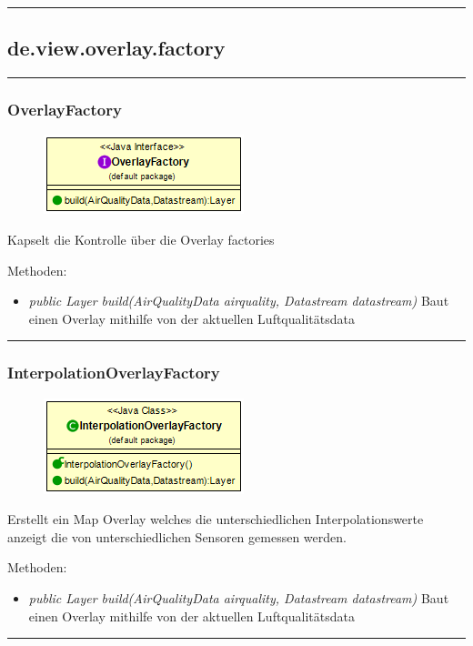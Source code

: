 \rule{\textwidth}{0.4pt}
\subsection{de.view.overlay.factory}

\rule{\textwidth}{0.4pt}
\subsubsection{OverlayFactory}
\begin{minipage}{0.3\textwidth}
    \begin{figure}[H]
        {\centering\includegraphics[scale = 0.6
        ]{media/view/factory/OverlayFactory_Class.png}}
    \end{figure}
    \end{minipage} \hfill
    \begin{minipage}{0.6\textwidth}
Kapselt die Kontrolle über die Overlay factories
\end{minipage}
\vspace{\baselineskip}
Methoden: \begin{itemize} [noitemsep]
    \item \emph{public Layer build(AirQualityData airquality,  Datastream datastream)}  Baut einen Overlay mithilfe von der aktuellen Luftqualitätsdata
\end{itemize}

\rule{\textwidth}{0.4pt}
\subsubsection{InterpolationOverlayFactory}
\begin{minipage}{0.3\textwidth}
    \begin{figure}[H]
        {\centering\includegraphics[scale = 0.5
        ]{media/view/factory/InterpolationOverlayFactory_Class.png}}
    \end{figure}
    \end{minipage} \hfill
    \begin{minipage}{0.6\textwidth}
Erstellt ein Map Overlay welches die unterschiedlichen Interpolationswerte anzeigt die von unterschiedlichen Sensoren gemessen werden.
\end{minipage}
\vspace{\baselineskip}
Methoden: \begin{itemize} [noitemsep]
    \item \emph{public Layer build(AirQualityData airquality,  Datastream datastream)} Baut einen Overlay mithilfe von der aktuellen Luftqualitätsdata
\end{itemize}
    \rule{\textwidth}{0.4pt}
